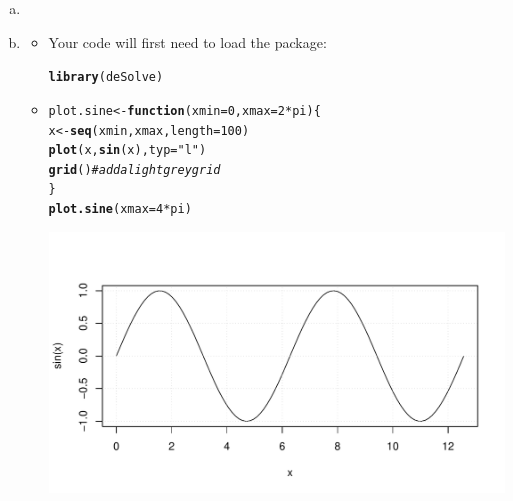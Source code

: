 \documentclass[12pt]{article}\usepackage[]{graphicx}\usepackage[]{color}
\makeatletter
\def\maxwidth{ %
  \ifdim\Gin@nat@width>\linewidth
    \linewidth
  \else
    \Gin@nat@width
  \fi
}
\newcommand{\hlnum}[1]{\textcolor[rgb]{0.686,0.059,0.569}{#1}}%
\newcommand{\hlstr}[1]{\textcolor[rgb]{0.192,0.494,0.8}{#1}}%
\newcommand{\hlcom}[1]{\textcolor[rgb]{0.678,0.584,0.686}{\textit{#1}}}%
\newcommand{\hlopt}[1]{\textcolor[rgb]{0,0,0}{#1}}%
\newcommand{\hlstd}[1]{\textcolor[rgb]{0.345,0.345,0.345}{#1}}%
\newcommand{\hlkwa}[1]{\textcolor[rgb]{0.161,0.373,0.58}{\textbf{#1}}}%
\newcommand{\hlkwb}[1]{\textcolor[rgb]{0.69,0.353,0.396}{#1}}%
\newcommand{\hlkwc}[1]{\textcolor[rgb]{0.333,0.667,0.333}{#1}}%
\newcommand{\hlkwd}[1]{\textcolor[rgb]{0.737,0.353,0.396}{\textbf{#1}}}%
\newenvironment{kframe}{%
 \def\at@end@of@kframe{}%
 \ifinner\ifhmode%
  \def\at@end@of@kframe{\end{minipage}}%
  \begin{minipage}{\columnwidth}%
 \fi\fi%
 \def\FrameCommand##1{\hskip\@totalleftmargin \hskip-\fboxsep
 \colorbox{shadecolor}{##1}\hskip-\fboxsep
     \hskip-\linewidth \hskip-\@totalleftmargin \hskip\columnwidth}%
 \MakeFramed {\advance\hsize-\width
   \@totalleftmargin\z@ \linewidth\hsize
   \@setminipage}}%
 {\par\unskip\endMakeFramed%
 \at@end@of@kframe}
\newenvironment{knitrout}{}{} %
\makeatother
\begin{document}
\begin{enumerate}[(a)]

\item \FitSIRa

\item \FitSIRbIntro
\begin{itemize}
    \item Your code will first need to load the  package:
\begin{knitrout}
\color{fgcolor}\begin{kframe}
\begin{alltt}
\hlkwd{library}\hlstd{(deSolve)}
\end{alltt}
\end{kframe}
\end{knitrout}
    \item \FitSIRbii
\begin{knitrout}
\color{fgcolor}\begin{kframe}
\begin{alltt}
\hlstd{plot.sine} \hlkwb{<-} \hlkwa{function}\hlstd{(} \hlkwc{xmin}\hlstd{=}\hlnum{0}\hlstd{,} \hlkwc{xmax}\hlstd{=}\hlnum{2}\hlopt{*}\hlstd{pi ) \{}
  \hlstd{x} \hlkwb{<-} \hlkwd{seq}\hlstd{(xmin,xmax,}\hlkwc{length}\hlstd{=}\hlnum{100}\hlstd{)}
  \hlkwd{plot}\hlstd{(x,} \hlkwd{sin}\hlstd{(x),} \hlkwc{typ}\hlstd{=}\hlstr{"l"}\hlstd{)}
  \hlkwd{grid}\hlstd{()} \hlcom{# add a light grey grid}
\hlstd{\}}
\hlkwd{plot.sine}\hlstd{(}\hlkwc{xmax}\hlstd{=}\hlnum{4}\hlopt{*}\hlstd{pi)}
\end{alltt}
\end{kframe}
\includegraphics[width=\maxwidth]{figure/plot_sine-1} 


\end{knitrout}
\end{itemize}
\end{enumerate}
\end{document}
